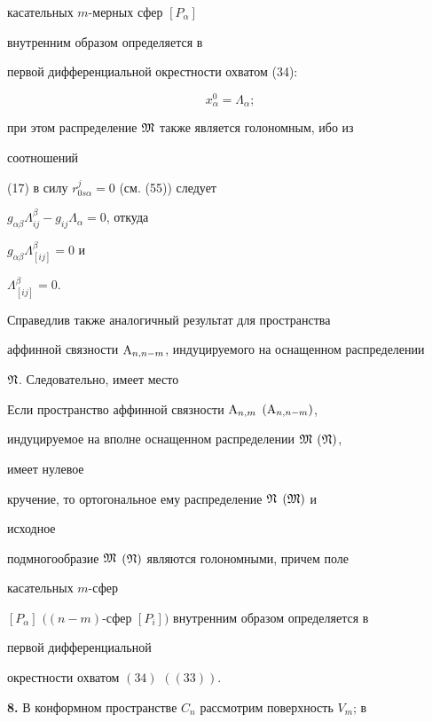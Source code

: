 касательных $m$-мерных сфер $[P_\alpha]$ 


внутренним образом определяется в 


первой дифференциальной окрестности охватом (34): 


$$ 


x^0_\alpha=\Lambda_\alpha; 


$$ 


при этом распределение $\frak M$ также является голономным, ибо из 


соотношений 


(17) в силу $r^j_{0s\alpha}=0$ (см. (55)) следует 


$g_{\alpha\beta}\Lambda^\beta_{ij}-g_{ij}\Lambda_\alpha=0$, откуда 


$g_{\alpha\beta}\Lambda^\beta_{[ij]}=0$ и 


$\Lambda^\beta_{[ij]}=0$. 


 


Справедлив также аналогичный результат для пространства 


аффинной связности $\mathrm{A}_{n,n-m}$, индуцируемого на оснащенном распределении 


$\frak N$. Следовательно, имеет место 


 


\begin{thm} 


Если пространство аффинной связности $\mathrm{A}_{n,m}$ $(\mathrm{A}_{n,n-m})$, 


индуцируемое на вполне оснащенном распределении $\frak M$ $(\frak N)$, 


имеет нулевое 


кручение, то ортогональное ему распределение $\frak N$ $(\frak M)$ и 


исходное 


подмногообразие $\frak M$ $(\frak N)$ являются голономными, причем поле 


касательных $m$-сфер 


$[P_\alpha]$ $((n-m)$-сфер $[P_i])$ внутренним образом определяется в 


первой дифференциальной 


окрестности охватом $(34)$ $((33))$. 


\end{thm} 


 


{\bf 8.} В конформном пространстве $C_n$ рассмотрим поверхность $V_m$; в 


